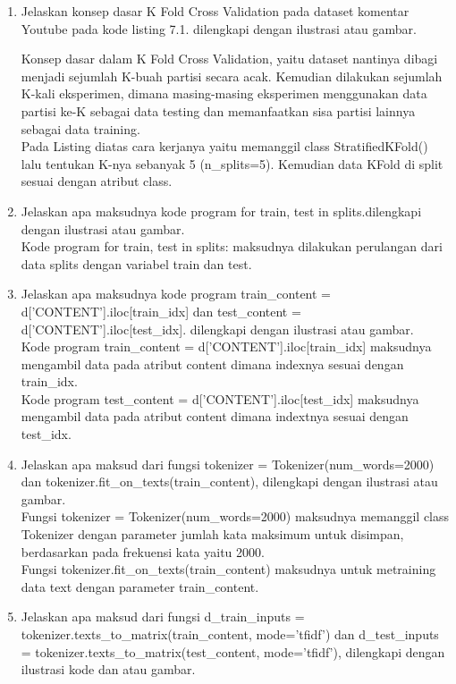 \begin{enumerate}
	\item Jelaskan konsep dasar K Fold Cross Validation pada dataset komentar Youtube pada kode listing 7.1. dilengkapi dengan ilustrasi atau gambar.
	
	Konsep dasar dalam K Fold Cross Validation, yaitu dataset nantinya dibagi menjadi sejumlah K-buah partisi secara acak. Kemudian dilakukan sejumlah K-kali eksperimen, dimana masing-masing eksperimen menggunakan data partisi ke-K sebagai data testing dan memanfaatkan sisa partisi lainnya sebagai data training.\\
	Pada Listing diatas cara kerjanya yaitu memanggil class StratifiedKFold() lalu tentukan K-nya sebanyak 5 (n\_splits=5). Kemudian data KFold di split sesuai dengan atribut class.
	\item Jelaskan apa maksudnya kode program for train, test in splits.dilengkapi dengan ilustrasi atau gambar.\\
	Kode program for train, test in splits: maksudnya dilakukan perulangan dari data splits dengan variabel train dan test.
	\item Jelaskan apa maksudnya kode program train\_content = d['CONTENT'].iloc[train\_idx] dan test\_content = d['CONTENT'].iloc[test\_idx]. dilengkapi dengan ilustrasi atau gambar.\\
	Kode program train\_content = d['CONTENT'].iloc[train\_idx] maksudnya mengambil data pada atribut content dimana indexnya sesuai dengan train\_idx.\\
	Kode program test\_content = d['CONTENT'].iloc[test\_idx] maksudnya mengambil data pada atribut content dimana indextnya sesuai dengan test\_idx.
	\item Jelaskan apa maksud dari fungsi tokenizer = Tokenizer(num\_words=2000) dan tokenizer.fit\_on\_texts(train\_content), dilengkapi dengan ilustrasi atau gambar.\\
	Fungsi tokenizer = Tokenizer(num\_words=2000) maksudnya memanggil class Tokenizer dengan parameter jumlah kata maksimum untuk disimpan, berdasarkan
	pada frekuensi kata yaitu 2000.\\
	Fungsi tokenizer.fit\_on\_texts(train\_content) maksudnya untuk metraining data text dengan parameter train\_content.
	\item Jelaskan apa maksud dari fungsi d\_train\_inputs = tokenizer.texts\_to\_matrix(train\_content, mode='tfidf') dan d\_test\_inputs = tokenizer.texts\_to\_matrix(test\_content, mode='tfidf'), dilengkapi dengan ilustrasi kode dan atau gambar.\\

\end{enumerate}
